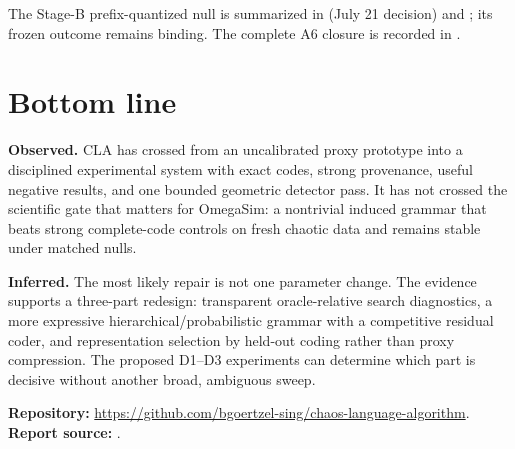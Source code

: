 \documentclass[10pt]{article}
\newcommand{\obs}{\textbf{Observed.}}
\newcommand{\inferd}{\textbf{Inferred.}}
\newcommand{\codeurl}{\url{https://github.com/bgoertzel-sing/chaos-language-algorithm}}
\begin{document}
The Stage-B prefix-quantized null is summarized in
 (July 21 decision) and
; its frozen outcome remains binding. The complete A6 closure is
recorded in
.

\section{Bottom line}

\obs{} CLA has crossed from an uncalibrated proxy prototype into a disciplined
experimental system with exact codes, strong provenance, useful negative
results, and one bounded geometric detector pass. It has not crossed the
scientific gate that matters for OmegaSim: a nontrivial induced grammar that
beats strong complete-code controls on fresh chaotic data and remains stable
under matched nulls.

\inferd{} The most likely repair is not one parameter change. The evidence
supports a three-part redesign: transparent oracle-relative search
diagnostics, a more expressive hierarchical/probabilistic grammar with a
competitive residual coder, and representation selection by held-out coding
rather than proxy compression. The proposed D1--D3 experiments can determine
which part is decisive without another broad, ambiguous sweep.

\vfill
\small
\textbf{Repository:} \codeurl.\\
\textbf{Report source:}
.
\end{document}
